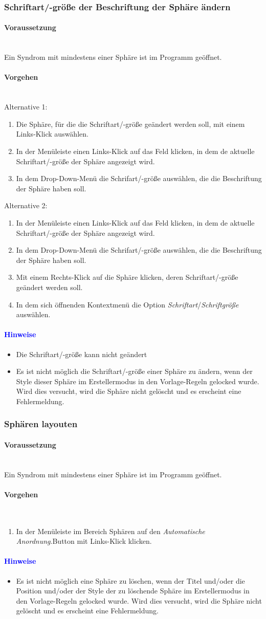\documentclass[enabledeprecatedfontcommands,fontsize=11pt,paper=a4,twoside]{scrartcl}
\newcommand*{\hint}{\paragraph{\textcolor{blue}{Hinweise}}}
\newcommand*{\condition}{\paragraph{Voraussetzung}$\;$ \vspace{0.2cm}\\}
\newcommand*{\actions}{\paragraph{Vorgehen} $\;$\vspace{0.2cm}\\}
\begin{document}
		\subsubsection{Schriftart/-größe der Beschriftung der Sphäre ändern}
				\condition 	
		Ein Syndrom mit mindestens einer Sphäre ist im Programm geöffnet. 
		\actions  
		Alternative 1:
		\begin{enumerate}
			\item Die Sphäre, für die die Schriftart/-größe geändert werden soll, mit einem Links-Klick auswählen.
			\item In der Menüleiste einen Links-Klick auf das Feld klicken, in dem de aktuelle Schriftart/-größe der Sphäre angezeigt wird.
			\item In dem Drop-Down-Menü die Schrifart/-größe auswählen, die die Beschriftung der Sphäre haben soll.
		\end{enumerate}
		Alternative 2:
			\begin{enumerate}
			\item In der Menüleiste einen Links-Klick auf das Feld klicken, in dem de aktuelle Schriftart/-größe der Sphäre angezeigt wird.
			\item In dem Drop-Down-Menü die Schrifart/-größe auswählen, die die Beschriftung der Sphäre haben soll.
			\item Mit einem Rechts-Klick auf die Sphäre klicken, deren Schriftart/-größe geändert werden soll.
			\item In dem sich öffnenden Kontextmenü die Option \textit{Schriftart}/\textit{Schriftgröße} auswählen.
		\end{enumerate}
		\hint
		\begin{itemize}
			\item Die Schriftart/-größe kann nicht geändert
			\item Es ist nicht möglich die Schriftart/-größe einer Sphäre zu ändern, wenn der Style dieser Sphäre im Erstellermodus in den Vorlage-Regeln gelocked wurde. Wird dies versucht, wird die Sphäre nicht gelöscht und es erscheint eine Fehlermeldung.
			\end{itemize}
		\subsubsection{Sphären layouten}
				\condition 	
		Ein Syndrom mit mindestens einer Sphäre ist im Programm geöffnet. 
		\actions  
		\begin{enumerate}
			\item In der Menüleiste im Bereich Sphären auf den \textit{Automatische Anordnung}.Button mit Links-Klick klicken.
		\end{enumerate}
		\hint
		\begin{itemize}
			\item Es ist nicht möglich eine Sphäre zu löschen, wenn der Titel und/oder die Position und/oder der Style der zu löschende Sphäre im Erstellermodus in den Vorlage-Regeln gelocked wurde. Wird dies versucht, wird die Sphäre nicht gelöscht und es erscheint eine Fehlermeldung.
			\end{itemize}
		\newpage
\end{document}

